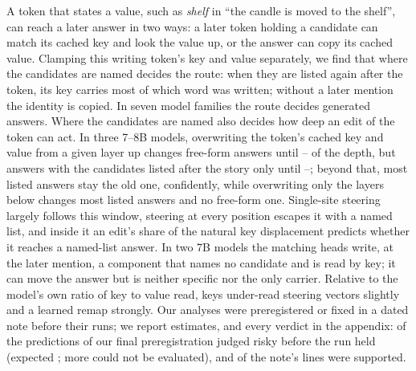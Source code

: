 A token that states a value, such as \emph{shelf} in ``the candle is moved to the shelf'', can reach a later answer in two ways: a later token holding a candidate can match its cached key and look the value up, or the answer can copy its cached value. Clamping this writing token's key and value separately, we find that where the candidates are named decides the route: when they are listed again after the token, its key carries most of which word was written; without a later mention the identity is copied. In seven model families the route decides generated answers. Where the candidates are named also decides how deep an edit of the token can act. In three 7--8B models, overwriting the token's cached key and value from a given layer up changes free-form answers until \pctn{\NqLcFracNoneMin}--\pct{\NqLcFracNoneMax} of the depth, but answers with the candidates listed after the story only until \pctn{\NqLcFracListedMin}--\pct{\NqLcFracListedMax}; beyond that, most listed answers stay the old one, confidently, while overwriting only the layers below changes most listed answers and no free-form one. Single-site steering largely follows this window, steering at every position escapes it with a named list, and inside it an edit's share of the natural key displacement predicts whether it reaches a named-list answer. In two 7B models the matching heads write, at the later mention, a component that names no candidate and is read by key; it can move the answer but is neither specific nor the only carrier. Relative to the model's own ratio of key to value read, keys under-read steering vectors slightly and a learned remap strongly. Our analyses were preregistered or fixed in a dated note before their runs; we report estimates, and every verdict in the appendix: \JxRiskyMetABCD{} of the \JxRiskyVerdABCD{} predictions of our final preregistration judged risky before the run held (expected \JxRiskyExpABCD; \JxRiskyNotEvalABCD{} more could not be evaluated), and \NqTotSupported{} of the note's \NqTotLines{} lines were supported.
